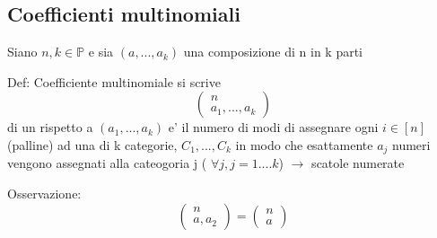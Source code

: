 \documentclass{article}
\begin{document}
        \subsection{Coefficienti multinomiali}
        \begin{flushleft}
          Siano $n,k \in \mathbb{P}$ e sia $(a,...,a_k)$ una composizione di n in k parti
        \end{flushleft}
        \begin{flushleft}
          Def: Coefficiente multinomiale si scrive 
          \begin{equation}
            \begin{pmatrix}
              n \\ 
              a_1,...,a_k
            \end{pmatrix}
          \end{equation}
          di un rispetto a $(a_1,...,a_k)$ e' il numero di modi di assegnare ogni $ i \in [n]$ (palline) ad una di k categorie, $C_1,...,C_k$ 
          in modo che esattamente $a_j$ numeri vengono assegnati alla cateogoria j ( $\forall j, j=1....k$) $\to$ scatole numerate
        \end{flushleft}
        \begin{flushleft}
          Osservazione: \begin{equation}
           \begin{pmatrix}
            n \\ 
             a,a_2
           \end{pmatrix}=\begin{pmatrix}
            n \\ 
             a
           \end{pmatrix}
          \end{equation}
        \end{flushleft}
\end{document}
